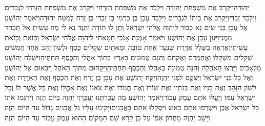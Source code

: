 \documentclass[../main/main.tex]{subfiles}
\begin{document}
\begin{multicols*}{\ncols}
יְהוּדָה\PreVerseSpace{}וַיַּקְרֵב אֶת מִשְׁפְּחֹת\SubEnd{} יְהוּדָה וַיִּלְכֹּד אֵת מִשְׁפַּחַת הַזַּרְחִי וַיַּקְרֵב אֶת מִשְׁפַּחַת הַזַּרְחִי לַגְּבָרִים וַיִּלָּכֵד זַבְדִּי\PreVerseSpace{}וַיַּקְרֵב אֶת בֵּיתוֹ לַגְּבָרִים וַיִּלָּכֵד עָכָן בֶּן כַּרְמִי בֶן זַבְדִּי בֶּן זֶרַח לְמַטֵּה יְהוּדָה\PreVerseSpace{}וַיֹּאמֶר יְהוֹשֻׁעַ אֶל עָכָן בְּנִי שִׂים נָא כָבוֹד לַיהוָה אֱלֹהֵי יִשְׂרָאֵל וְתֶן לוֹ תוֹדָה וְהַגֶּד נָא לִי מֶה עָשִׂיתָ אַל תְּכַחֵד מִמֶּנִּי\PreVerseSpace{}וַיַּעַן עָכָן אֶת יְהוֹשֻׁעַ וַיֹּאמַר אָמְנָה אָנֹכִי חָטָאתִי לַיהוָה אֱלֹהֵי יִשְׂרָאֵל וְכָזֹאת וְכָזֹאת עָשִׂיתִי\PreVerseSpace{}וָאֶרְאֶה בַשָּׁלָל אַדֶּרֶת שִׁנְעָר אַחַת טוֹבָה וּמָאתַיִם שְׁקָלִים כֶּסֶף וּלְשׁוֹן זָהָב אֶחָד חֲמִשִּׁים שְׁקָלִים מִשְׁקָלוֹ וָאֶחְמְדֵם וָאֶקָּחֵם וְהִנָּם טְמוּנִים בָּאָרֶץ בְּתוֹךְ אָהֳלִי\SubEnd{} וְהַכֶּסֶף תַּחְתֶּיהָ\PreVerseSpace{}וַיִּשְׁלַח יְהוֹשֻׁעַ מַלְאָכִים וַיָּרֻצוּ הָאֹהֱלָה וְהִנֵּה טְמוּנָה בְּאָהֳלוֹ וְהַכֶּסֶף תַּחְתֶּיהָ\PreVerseSpace{}וַיִּקָּחוּם מִתּוֹךְ הָאֹהֶל וַיְבִאוּם אֶל יְהוֹשֻׁעַ וְאֶל כָּל בְּנֵי יִשְׂרָאֵל וַיַּצִּקֻם לִפְנֵי יַהְוֶה\PreVerseSpace{}וַיִּקַּח יְהוֹשֻׁעַ אֶת עָכָן בֶּן זֶרַח וְאֶת הַכֶּסֶף וְאֶת הָאַדֶּרֶת וְאֶת לְשׁוֹן הַזָּהָב וְאֶת בָּנָיו וְאֶת בְּנֹתָיו וְאֶת שׁוֹרוֹ וְאֶת חֲמֹרוֹ וְאֶת צֹאנוֹ וְאֶת אָהֳלוֹ וְאֶת כָּל אֲשֶׁר לוֹ וְכָל יִשְׂרָאֵל עִמּוֹ וַיַּעֲלוּ אֹתָם עֵמֶק עָכוֹר\PreVerseSpace{}וַיֹּאמֶר יְהוֹשֻׁעַ מֶה עֲכַרְתָּנוּ יַעַכָּרְךָ יַהְוֶה בַּיּוֹם הַזֶּה וַיִּרְגְּמוּ אֹתוֹ כָל יִשְׂרָאֵל אֶבֶן וַיִּשְׂרְפוּ אֹתָם בָּאֵשׁ וַיִּסְקְלוּ אֹתָם בָּאֲבָנִים\PreVerseSpace{}וַיָּקִימוּ עָלָיו גַּל אֲבָנִים גָּדוֹל עַד הַיּוֹם הַזֶּה וַיָּשָׁב יַהְוֶה מֵחֲרוֹן אַפּוֹ עַל כֵּן קָרָא שֵׁם הַמָּקוֹם הַהוּא עֵמֶק עָכוֹר עַד הַיּוֹם הַזֶּה\OpenSection{}\par

\end{multicols*}
\end{document}
